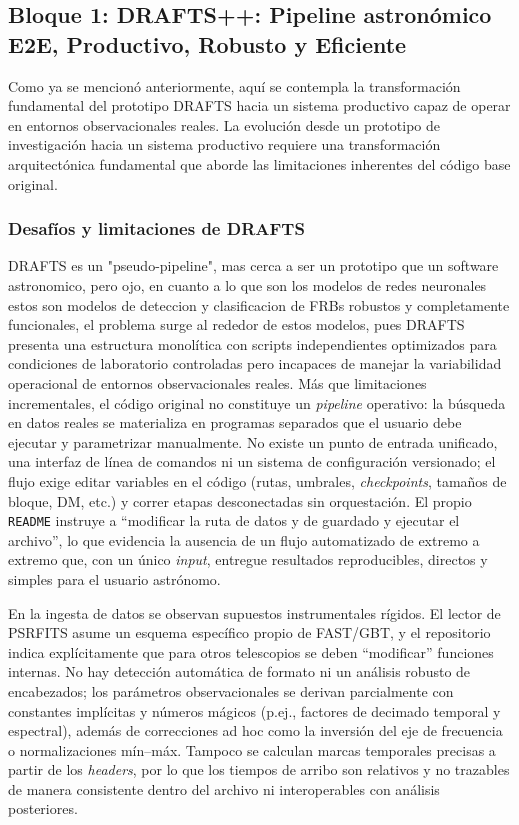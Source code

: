 \subsection{Bloque 1: DRAFTS++: Pipeline astronómico E2E, Productivo, Robusto y Eficiente}

Como ya se mencionó anteriormente, aquí se contempla la transformación fundamental del prototipo DRAFTS hacia un sistema productivo capaz de operar en entornos observacionales reales. La evolución desde un prototipo de investigación hacia un sistema productivo requiere una transformación arquitectónica fundamental que aborde las limitaciones inherentes del código base original.

\subsubsection{Desafíos y limitaciones de DRAFTS}

DRAFTS es un "pseudo-pipeline", mas cerca a ser un prototipo que un software astronomico, pero ojo, en cuanto a lo que son los modelos de redes neuronales estos son modelos de deteccion y clasificacion de FRBs robustos y completamente funcionales, el problema surge al rededor de estos modelos, pues DRAFTS presenta una estructura monolítica con scripts independientes optimizados para condiciones de laboratorio controladas pero incapaces de manejar la variabilidad operacional de entornos observacionales reales. Más que limitaciones incrementales, el código original no constituye un \emph{pipeline} operativo: la búsqueda en datos reales se materializa en programas separados que el usuario debe ejecutar y parametrizar manualmente. No existe un punto de entrada unificado, una interfaz de línea de comandos ni un sistema de configuración versionado; el flujo exige editar variables en el código (rutas, umbrales, \textit{checkpoints}, tamaños de bloque, DM, etc.) y correr etapas desconectadas sin orquestación. El propio \texttt{README} instruye a “modificar la ruta de datos y de guardado y ejecutar el archivo”, lo que evidencia la ausencia de un flujo automatizado de extremo a extremo que, con un único \emph{input}, entregue resultados reproducibles, directos y simples para el usuario astrónomo.

En la ingesta de datos se observan supuestos instrumentales rígidos. El lector de PSRFITS asume un esquema específico propio de FAST/GBT, y el repositorio indica explícitamente que para otros telescopios se deben “modificar” funciones internas. No hay detección automática de formato ni un análisis robusto de encabezados; los parámetros observacionales se derivan parcialmente con constantes implícitas y números mágicos (p.ej., factores de decimado temporal y espectral), además de correcciones ad hoc como la inversión del eje de frecuencia o normalizaciones mín--máx. Tampoco se calculan marcas temporales precisas a partir de los \emph{headers}, por lo que los tiempos de arribo son relativos y no trazables de manera consistente dentro del archivo ni interoperables con análisis posteriores.


